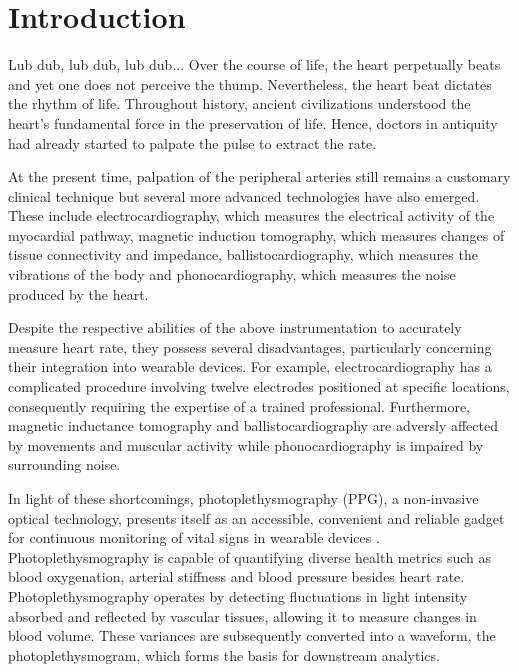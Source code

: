 
\section{Introduction}

Lub dub, lub dub, lub dub... Over the course of life, the heart perpetually beats and yet one does not perceive the thump. Nevertheless, the heart beat dictates the rhythm of life. Throughout history, ancient civilizations understood the heart's fundamental force in the preservation of life. Hence, doctors in antiquity had already started to palpate the pulse to extract the rate. \cite{hajar_pulse_2018}

At the present time, palpation of the peripheral arteries still remains a customary clinical technique but several more advanced technologies have also emerged. These include electrocardiography, which measures the electrical activity of the myocardial pathway, magnetic induction tomography, which measures changes of tissue connectivity and impedance, ballistocardiography, which measures the vibrations of the body and phonocardiography, which measures the noise produced by the heart. \cite{ludwig_measurement_2018}

Despite the respective abilities of the above instrumentation to accurately measure heart rate, they possess several disadvantages, particularly concerning their integration into wearable devices. For example, electrocardiography has a complicated procedure involving twelve electrodes positioned at specific locations, consequently requiring the expertise of a trained professional. Furthermore, magnetic inductance tomography and ballistocardiography are adversly affected by movements and muscular activity while phonocardiography is impaired by surrounding noise. \cite{ludwig_measurement_2018}

In light of these shortcomings, photoplethysmography (PPG), a non-invasive optical technology, presents itself as an accessible, convenient and reliable gadget for continuous monitoring of vital signs in wearable devices \cite{kim_photoplethysmography_2023}. Photoplethysmography is capable of quantifying diverse health metrics such as blood oxygenation, arterial stiffness and blood pressure besides heart rate. Photoplethysmography operates by detecting fluctuations in light intensity absorbed and reflected by vascular tissues, allowing it to measure changes in blood volume. These variances are subsequently converted into a waveform, the photoplethysmogram, which forms the basis for downstream analytics. \cite{kyriacou_photoplethysmography_2022}

